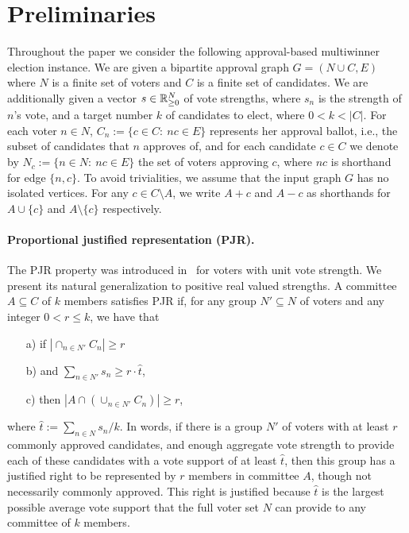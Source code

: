 \section{Preliminaries}\label{s:prel}

Throughout the paper we consider the following approval-based multiwinner election instance. 
We are given a bipartite approval graph $G=(N\cup C, E)$ where $N$ is a finite set of voters and $C$ is a finite set of candidates. 
We are additionally given a vector $s\in\mathbb{R}_{\geq 0}^N$ of vote strengths, where $s_n$ is the strength of $n$'s vote, and a target number $k$ of candidates to elect, where $0< k<|C|$.
For each voter $n\in N$, $C_n:=\{c\in C: \ nc\in E\}$ represents her approval ballot, i.e., the subset of candidates that $n$ approves of, and for each candidate $c\in C$ we denote by $N_c:=\{n\in N: \ nc\in E\}$ the set of voters approving $c$, where $nc$ is shorthand for edge $\{n,c\}$. 
To avoid trivialities, we assume that the input graph $G$ has no isolated vertices. 
For any $c\in C\setminus A$, we write $A+c$ and $A-c$ as shorthands for $A\cup\{c\}$ and $A\setminus \{c\}$ respectively. 

\paragraph{Proportional justified representation (PJR).} 
The PJR property was introduced in~\cite{sanchez2017proportional} for voters with unit vote strength. We present its natural generalization to positive real valued strengths. 
A committee $A\subseteq C$ of $k$ members satisfies PJR if, for any group $N'\subseteq N$ of voters and any integer $0<r\leq k$, we have that 
\begin{itemize}
\item[a)] if $|\cap_{n\in N'} C_n|\geq r$
\item[b)] and $\sum_{n\in N'} s_n \geq r\cdot \hat{t}$, 
\item[c)] then $|A\cap (\cup_{n\in N'} C_n)|\geq r$,
\end{itemize}
%
where $\hat{t}:=\sum_{n\in N} s_n / k$. 
In words, if there is a group $N'$ of voters with at least $r$ commonly approved candidates, and enough aggregate vote strength to provide each of these candidates with a vote support of at least $\hat{t}$, then this group has a justified right to be represented by $r$ members in committee $A$, though not necessarily commonly approved. 
This right is justified because $\hat{t}$ is the largest possible average vote support that the full voter set $N$ can provide to any committee of $k$ members. 

